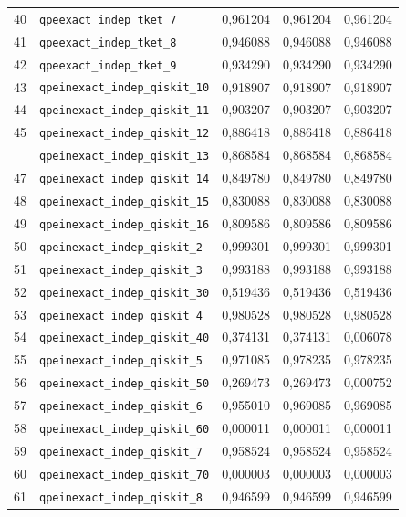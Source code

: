 \documentclass[a4paper,10pt]{article}
\begin{document}
\begin{longtable}{r p{8.2cm} r r r}
40 & \nolinkurl{qpeexact_indep_tket_7} & 0,961204 & 0,961204 & 0,961204\\ 
41 & \nolinkurl{qpeexact_indep_tket_8} & 0,946088 & 0,946088 & 0,946088\\ 
42 & \nolinkurl{qpeexact_indep_tket_9} & 0,934290 & 0,934290 & 0,934290\\ 
43 & \nolinkurl{qpeinexact_indep_qiskit_10} & 0,918907 & 0,918907 & 0,918907\\ 
44 & \nolinkurl{qpeinexact_indep_qiskit_11} & 0,903207 & 0,903207 & 0,903207\\ 
45 & \nolinkurl{qpeinexact_indep_qiskit_12} & 0,886418 & 0,886418 & 0,886418\\ 
\pagebreak[4]
46 & \nolinkurl{qpeinexact_indep_qiskit_13} & 0,868584 & 0,868584 & 0,868584\\ 
47 & \nolinkurl{qpeinexact_indep_qiskit_14} & 0,849780 & 0,849780 & 0,849780\\ 
48 & \nolinkurl{qpeinexact_indep_qiskit_15} & 0,830088 & 0,830088 & 0,830088\\ 
49 & \nolinkurl{qpeinexact_indep_qiskit_16} & 0,809586 & 0,809586 & 0,809586\\ 
50 & \nolinkurl{qpeinexact_indep_qiskit_2} & 0,999301 & 0,999301 & 0,999301\\ 
51 & \nolinkurl{qpeinexact_indep_qiskit_3} & 0,993188 & 0,993188 & 0,993188\\ 
52 & \nolinkurl{qpeinexact_indep_qiskit_30} & 0,519436 & 0,519436 & 0,519436\\ 
53 & \nolinkurl{qpeinexact_indep_qiskit_4} & 0,980528 & 0,980528 & 0,980528\\ 
54 & \nolinkurl{qpeinexact_indep_qiskit_40} & 0,374131 & 0,374131 & 0,006078\\ 
55 & \nolinkurl{qpeinexact_indep_qiskit_5} & 0,971085 & 0,978235 & 0,978235\\ 
56 & \nolinkurl{qpeinexact_indep_qiskit_50} & 0,269473 & 0,269473 & 0,000752\\ 
57 & \nolinkurl{qpeinexact_indep_qiskit_6} & 0,955010 & 0,969085 & 0,969085\\ 
58 & \nolinkurl{qpeinexact_indep_qiskit_60} & 0,000011 & 0,000011 & 0,000011\\ 
59 & \nolinkurl{qpeinexact_indep_qiskit_7} & 0,958524 & 0,958524 & 0,958524\\ 
60 & \nolinkurl{qpeinexact_indep_qiskit_70} & 0,000003 & 0,000003 & 0,000003\\ 
61 & \nolinkurl{qpeinexact_indep_qiskit_8} & 0,946599 & 0,946599 & 0,946599\\ 

\end{longtable}
\end{document}
